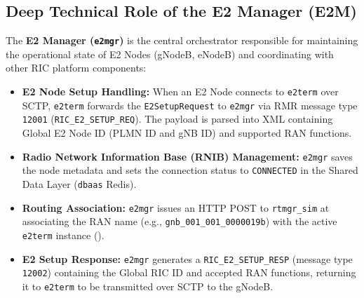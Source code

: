 \documentclass[11pt,a4paper]{article}
\begin{document}
\subsection{Deep Technical Role of the E2 Manager (E2M)}
The \textbf{E2 Manager (\texttt{e2mgr})} is the central orchestrator responsible for maintaining the operational state of E2 Nodes (gNodeB, eNodeB) and coordinating with other RIC platform components:
\begin{itemize}
    \item \textbf{E2 Node Setup Handling:} When an E2 Node connects to \texttt{e2term} over SCTP, \texttt{e2term} forwards the \texttt{E2SetupRequest} to \texttt{e2mgr} via RMR message type \texttt{12001} (\texttt{RIC\_E2\_SETUP\_REQ}). The payload is parsed into XML containing Global E2 Node ID (PLMN ID and gNB ID) and supported RAN functions.
    \item \textbf{Radio Network Information Base (RNIB) Management:} \texttt{e2mgr} saves the node metadata and sets the connection status to \texttt{CONNECTED} in the Shared Data Layer (\texttt{dbaas} Redis).
    \item \textbf{Routing Association:} \texttt{e2mgr} issues an HTTP POST to \texttt{rtmgr\_sim} at  associating the RAN name (e.g., \texttt{gnb\_001\_001\_0000019b}) with the active \texttt{e2term} instance ().
    \item \textbf{E2 Setup Response:} \texttt{e2mgr} generates a \texttt{RIC\_E2\_SETUP\_RESP} (message type \texttt{12002}) containing the Global RIC ID and accepted RAN functions, returning it to \texttt{e2term} to be transmitted over SCTP to the gNodeB.
\end{itemize}
\end{document}
